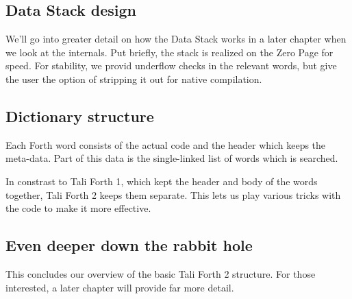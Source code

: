 \subsection{Data Stack design}

We'll go into greater detail on how the Data Stack works in a later chapter when
we look at the internals. Put briefly, the stack is realized on the Zero
Page for speed. For stability, we provid underflow
checks in the relevant words, but give the user the
option of stripping it out for native compilation.


\subsection{Dictionary structure}

Each Forth word consists of the actual code and the header which
keeps the meta-data. Part of this data is the single-linked list of words which
is searched. 

In constrast to Tali Forth 1, which kept the header and body
of the words together, Tali Forth 2 keeps them separate. This lets us play
various tricks with the code to make it more effective.

\subsection{Even deeper down the rabbit hole}

This concludes our overview of the basic Tali Forth 2 structure. For those
interested, a later chapter will provide far more detail.
